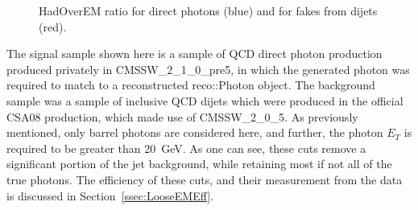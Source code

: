 \documentclass{cmspaper}
\begin{document}
\begin{figure}[hbtp]
  \begin{center}
    \caption{HadOverEM ratio for direct photons (blue) and for fakes from dijets (red).}
    \label{fig:HadOverEM_EMLoose}
  \end{center}
\end{figure}
The signal sample shown here is a sample of QCD direct photon production produced privately in CMSSW\_2\_1\_0\_pre5, in which the generated photon was required to match to a reconstructed reco::Photon object.  The background sample was a sample of inclusive QCD dijets which were produced in the official CSA08 production, which made use of CMSSW\_2\_0\_5.  As previously mentioned, only barrel photons are considered here, and further, the photon $E_{T}$ is required to be greater than 20~GeV.
As one can see, these cuts remove a significant portion of the jet background, while retaining most if not all of the true photons.  The efficiency of these cuts, and their measurement from the data is discussed in Section~\ref{ssec:LooseEMEff}.
\end{document}
